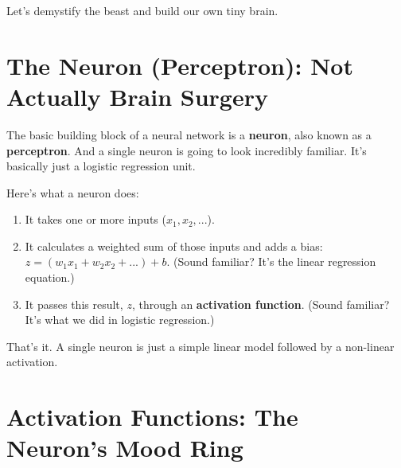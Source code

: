 \documentclass[11pt, letterpaper, openany]{book}
\begin{document}
Let's demystify the beast and build our own tiny brain.

\section{The Neuron (Perceptron): Not Actually Brain Surgery}

The basic building block of a neural network is a \textbf{neuron}, also known as a \textbf{perceptron}. And a single neuron is going to look incredibly familiar. It's basically just a logistic regression unit.

Here's what a neuron does:
\begin{enumerate}
    \item It takes one or more inputs ($x_1, x_2, ...$).
    \item It calculates a weighted sum of those inputs and adds a bias: $z = (w_1x_1 + w_2x_2 + ...) + b$. (Sound familiar? It's the linear regression equation.)
    \item It passes this result, $z$, through an \textbf{activation function}. (Sound familiar? It's what we did in logistic regression.)
\end{enumerate}
That's it. A single neuron is just a simple linear model followed by a non-linear activation.

\section{Activation Functions: The Neuron's Mood Ring}
\end{document}
